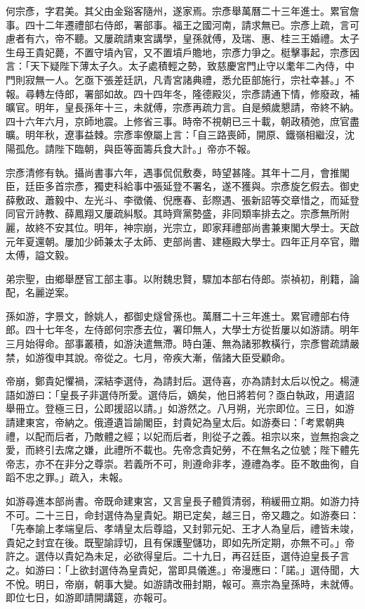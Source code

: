 \begin{pinyinscope}
何宗彥，字君美。其父由金谿客隨州，遂家焉。宗彥舉萬曆二十三年進士。累官詹事。四十二年遷禮部右侍郎，署部事。福王之國河南，請求無已。宗彥上疏，言可慮者有六，帝不聽。又屢疏請東宮講學，皇孫就傅，及瑞、惠、桂三王婚禮。太子生母王貴妃薨，不置守墳內官，又不置墳戶贍地，宗彥力爭之。梃擊事起，宗彥因言：「天下疑陛下薄太子久。太子處積輕之勢，致慈慶宮門止守以耄年二內侍，中門則寂無一人。乞亟下張差廷訊，凡青宮諸典禮，悉允臣部施行，宗社幸甚。」不報。尋轉左侍郎，署部如故。四十四年冬，隆德殿災，宗彥請通下情，修廢政，補曠官。明年，皇長孫年十三，未就傅，宗彥再疏力言。自是頻歲懇請，帝終不納。四十六年六月，京師地震。上修省三事。時帝不視朝已三十載，朝政積弛，庶官盡曠。明年秋，遼事益棘。宗彥率僚屬上言：「自三路喪師，開原、鐵嶺相繼沒，沈陽孤危。請陛下臨朝，與臣等面籌兵食大計。」帝亦不報。

宗彥清修有執。攝尚書事六年，遇事侃侃敷奏，時望甚隆。其年十二月，會推閣臣，廷臣多首宗彥，獨吏科給事中張延登不署名，遂不獲與。宗彥旋乞假去。御史薛敷政、蕭毅中、左光斗、李徵儀、倪應春、彭際遇、張新詔等交章惜之，而延登同官亓詩教、薛鳳翔又屢疏糾駁。其時齊黨勢盛，非同類率排去之。宗彥無所附麗，故終不安其位。明年，神宗崩，光宗立，即家拜禮部尚書兼東閣大學士。天啟元年夏還朝。屢加少師兼太子太師、吏部尚書、建極殿大學士。四年正月卒官，贈太傅，謚文毅。

弟宗聖，由鄉舉歷官工部主事。以附魏忠賢，驟加本部右侍郎。崇禎初，削籍，論配，名麗逆案。

孫如游，字景文，餘姚人，都御史燧曾孫也。萬曆二十三年進士。累官禮部右侍郎。四十七年冬，左侍郎何宗彥去位，署印無人，大學士方從哲屢以如游請。明年三月始得命。部事叢積，如游決遣無滯。時白蓮、無為諸邪教橫行，宗彥嘗疏請嚴禁，如游復申其說。帝從之。七月，帝疾大漸，偕諸大臣受顧命。

帝崩，鄭貴妃懼禍，深結李選侍，為請封后。選侍喜，亦為請封太后以悅之。楊漣語如游曰：「皇長子非選侍所愛。選侍后，嫡矣，他日將若何？亟白執政，用遺詔舉冊立。登極三日，公即援詔以請。」如游然之。八月朔，光宗即位。三日，如游請建東宮，帝納之。俄遵遺旨諭閣臣，封貴妃為皇太后。如游奏曰：「考累朝典禮，以配而后者，乃敵體之經；以妃而后者，則從子之義。祖宗以來，豈無抱衾之愛，而終引去席之嫌，此禮所不載也。先帝念貴妃勞，不在無名之位號；陛下體先帝志，亦不在非分之尊崇。若義所不可，則遵命非孝，遵禮為孝。臣不敢曲徇，自蹈不忠之罪。」疏入，未報。

如游尋進本部尚書。帝既命建東宮，又言皇長子體質清弱，稍緩冊立期。如游力持不可。二十三日，命封選侍為皇貴妃。期已定矣，越三日，帝又趣之。如游奏曰：「先奉諭上孝端皇后、孝靖皇太后尊謚，又封郭元妃、王才人為皇后，禮皆未竣，貴妃之封宜在後。既聖諭諄切，且有保護聖儲功，即如先所定期，亦無不可。」帝許之。選侍以貴妃為未足，必欲得皇后。二十九日，再召廷臣，選侍迫皇長子言之。如游曰：「上欲封選侍為皇貴妃，當即具儀進。」帝漫應曰：「諾。」選侍聞，大不悅。明日，帝崩，朝事大變。如游請改冊封期，報可。熹宗為皇孫時，未就傅。即位七日，如游即請開講筵，亦報可。


\end{pinyinscope}
